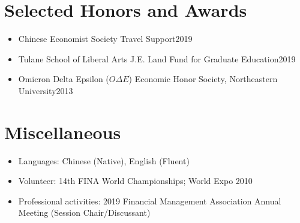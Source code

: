 \documentclass{resume}
\begin{document}

\section{Selected Honors and Awards}
\begin{itemize}[parsep=0.25ex]
  \item Chinese Economist Society Travel Support\hfill 2019
  \item Tulane School of Liberal Arts J.E. Land Fund for Graduate Education\hfill 2019
  \item Omicron Delta Epsilon ($O\Delta E$) Economic Honor Society, Northeastern University\hfill 2013
\end{itemize}

\section{Miscellaneous}
\begin{itemize}[parsep=0.25ex]
  \item Languages: 
  Chinese (Native), English (Fluent)
  
  \item Volunteer:
  14th FINA World Championships; World Expo 2010
  
  \item Professional activities:
  2019 Financial Management Association Annual Meeting (Session Chair/Discussant)
  

\end{itemize}

%
%
\end{document}
